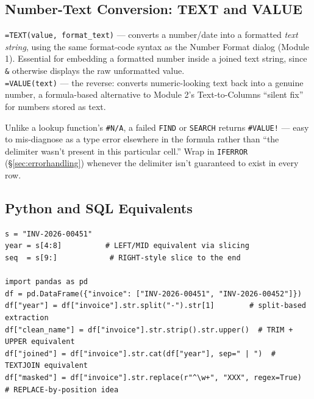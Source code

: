 \documentclass[11pt,a4paper]{article}
\begin{document}
\subsection{Number-Text Conversion: TEXT and VALUE}

\begin{formulasyntax}
\texttt{=TEXT(value, format\_text)} --- converts a number/date into a formatted \emph{text string}, using the same format-code syntax as the Number Format dialog (Module 1). Essential for embedding a formatted number inside a joined text string, since \texttt{\&} otherwise displays the raw unformatted value.\\
\texttt{=VALUE(text)} --- the reverse: converts numeric-looking text back into a genuine number, a formula-based alternative to Module 2's Text-to-Columns ``silent fix'' for numbers stored as text.
\end{formulasyntax}

\begin{pitfall}
Unlike a lookup function's \texttt{\#N/A}, a failed \texttt{FIND} or \texttt{SEARCH} returns \texttt{\#VALUE!} --- easy to mis-diagnose as a type error elsewhere in the formula rather than ``the delimiter wasn't present in this particular cell.'' Wrap in \texttt{IFERROR} (\S\ref{sec:errorhandling}) whenever the delimiter isn't guaranteed to exist in every row.
\end{pitfall}

\subsection{Python and SQL Equivalents}

\begin{lstlisting}[style=pythonstyle, caption={String slicing and pandas' vectorised .str accessor}]
s = "INV-2026-00451"
year = s[4:8]          # LEFT/MID equivalent via slicing
seq  = s[9:]            # RIGHT-style slice to the end

import pandas as pd
df = pd.DataFrame({"invoice": ["INV-2026-00451", "INV-2026-00452"]})
df["year"] = df["invoice"].str.split("-").str[1]        # split-based extraction
df["clean_name"] = df["invoice"].str.strip().str.upper()  # TRIM + UPPER equivalent
df["joined"] = df["invoice"].str.cat(df["year"], sep=" | ")  # TEXTJOIN equivalent
df["masked"] = df["invoice"].str.replace(r"^\w+", "XXX", regex=True)  # REPLACE-by-position idea
\end{lstlisting}
\end{document}
